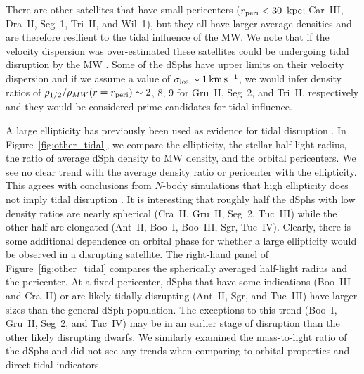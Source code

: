\documentclass[twocolumn]{aastex63}
\begin{document}
There are other satellites that have small pericenters ($r_{\rm peri} <30~\mathrm{\,kpc}$; Car~III, Dra~II, Seg~1, Tri~II, and Wil~1), but they all have larger average densities and are therefore  resilient to the tidal influence of the MW. 
We note that if the velocity dispersion  was over-estimated these satellites could be undergoing tidal disruption by the MW  \citep[e.g., from unresolved binaries][or from small sample sizes]{Minor2019MNRAS.487.2961M}. 
Some of the dSphs have upper limits on their velocity dispersion and if we assume a value of  $\sigma_{\rm los}\sim 1 \mathrm{\,km} \mathrm{\,s}^{-1}$,  we would infer   density ratios of $\rho_{1/2}/\rho_{MW}(r=r_{\rm peri})\sim2$, 8, 9 for Gru~II, Seg~2, and Tri~II, respectively and they would be considered prime candidates for tidal influence. 





A large ellipticity has previously been used as evidence for tidal disruption \citep[e.g.,][]{Munoz2010AJ....140..138M, Kupper2017ApJ...834..112K}.
In Figure~\ref{fig:other_tidal}, we  compare the ellipticity, the stellar half-light radius,  the ratio of average dSph density to MW density, and the orbital pericenters.  
We see no clear trend with the average density ratio  or pericenter  with the ellipticity. This agrees with conclusions from $N$-body simulations that high ellipticity does not imply tidal disruption \citep{Munoz2008ApJ...679..346M}. 
It is interesting that roughly half the dSphs with low density ratios are nearly spherical (Cra~II, Gru~II, Seg~2, Tuc~III) while the other half are  elongated (Ant~II, Boo~I, Boo~III, Sgr, Tuc~IV).
Clearly, there is some additional dependence on orbital phase for whether a large ellipticity would be observed in a disrupting satellite.
The right-hand panel of Figure~\ref{fig:other_tidal} compares the spherically averaged half-light radius and the pericenter.  At a fixed pericenter, dSphs that have some indications (Boo~III and Cra~II) or are  likely tidally disrupting  (Ant~II, Sgr, and Tuc~III) have larger sizes than the general dSph population.  The exceptions to this trend  (Boo~I, Gru~II, Seg~2, and Tuc~IV)  may be in an earlier stage of disruption than the other likely disrupting dwarfs. 
We similarly  examined the mass-to-light ratio of the dSphs and did not see any trends when comparing to orbital properties and direct tidal indicators. 
\end{document}
